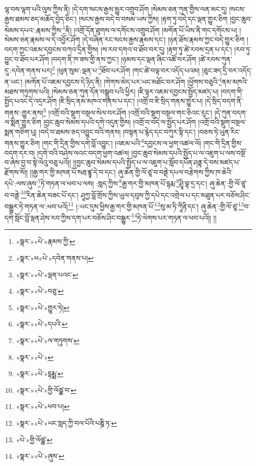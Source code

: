 ལྷ་བས་ལྷག་པའི་ལུས་ཀྱིས་ནི། །དེ་དག་སངས་རྒྱས་མྱུར་འགྲུབ་ཤོག །སེམས་ཅན་ཀུན་གྱིས་ལན་མང་དུ། །སངས་རྒྱས་ཐམས་ཅད་མཆོད་བྱེད་ཅིང་། །སངས་རྒྱས་བདེ་བ་བསམ་ཡས་ཀྱིས། །རྟག་ཏུ་བདེ་དང་ལྡན་གྱུར་ཅིག །བྱང་ཆུབ་སེམས་དཔའ་:རྣམས་ཀྱིས་\footnote{«སྣར་»«པེ་»རྣམས་ཀྱི་}ནི། །འགྲོ་དོན་ཐུགས་ལ་དགོངས་འགྲུབ་ཤོག །མགོན་པོ་ཡིས་ནི་གང་དགོངས་པ། །སེམས་ཅན་རྣམས་ལ་དེ་འབྱོར་ཤོག །དེ་བཞིན་རང་སངས་རྒྱས་རྣམས་དང་། །ཉན་ཐོས་རྣམས་ཀྱང་བདེ་གྱུར་ཅིག །བདག་ཀྱང་འཇམ་དབྱངས་བཀའ་དྲིན་གྱིས། །ས་རབ་དགའ་བ་ཐོབ་བར་དུ། །རྟག་ཏུ་ཚེ་རབས་དྲན་པ་དང་། །རབ་ཏུ་བྱུང་བ་ཐོབ་པར་ཤོག །བདག་ནི་ཁ་ཟས་གྱི་ནས་ཀྱང་། །ཉམས་དང་ལྡན་ཞིང་འཚོ་བར་ཤོག །ཚེ་རབས་ཀུན་དུ་:དབེན་གནས་པར།\footnote{«སྣར་»ཕ«པེ་»དབེན་གནས་པ།} །ཕུན་སུམ་:ལྡན་པ་\footnote{«སྣར་»«པེ་»ལྡན་པའང་}ཐོབ་པར་ཤོག །གང་ཚེ་བལྟ་བར་འདོད་པའམ། །ཅུང་ཟད་དྲི་བར་འདོད་ན་ཡང་། །མགོན་པོ་འཇམ་དབྱངས་དེ་ཉིད་ནི། །གེགས་མེད་པར་ཡང་མཐོང་བར་ཤོག །ཕྱོགས་བཅུའི་\footnote{«སྣར་»«པེ་»བཅུ་}ནམ་མཁའི་མཐས་གཏུགས་པའི། །སེམས་ཅན་ཀུན་དོན་བསྒྲུབ་པའི་ཕྱིར། །ཇི་ལྟར་འཇམ་དབྱངས་སྤྱོད་མཛད་པ། །བདག་གི་སྤྱོད་པའང་དེ་འདྲར་ཤོག །ཇི་སྲིད་ནམ་མཁའ་གནས་པ་དང་། །འགྲོ་བ་ཇི་སྲིད་གནས་གྱུར་པ། །དེ་སྲིད་བདག་ནི་གནས་:གྱུར་ནས།\footnote{«སྣར་»«པེ་»གྱུར་ཏེ།} །འགྲོ་བའི་སྡུག་བསྔལ་སེལ་བར་ཤོག །འགྲོ་བའི་སྡུག་བསྔལ་གང་ཅིའང་རུང་། །དེ་ཀུན་བདག་ལ་སྨིན་གྱུར་ཅིག །བྱང་ཆུབ་སེམས་དཔའི་དགེ་འདུན་གྱིས། །འགྲོ་བ་བདེ་ལ་སྤྱོད་པར་ཤོག །འགྲོ་བའི་སྡུག་བསྔལ་སྨན་གཅིག་པུ། །བདེ་བ་ཐམས་ཅད་འབྱུང་བའི་གནས། །བསྟན་པ་རྙེད་དང་བཀུར་སྟི་དང་། །བཅས་ཏེ་ཡུན་རིང་གནས་གྱུར་ཅིག །གང་གི་དྲིན་གྱིས་དགེ་བློ་འབྱུང་། །འཇམ་པའི་\footnote{«སྣར་»«པེ་»དཔའི་}དབྱངས་ལ་ཕྱག་འཚལ་ལོ། །གང་གི་དྲིན་གྱིས་བདག་དར་བ། །དགེ་བའི་བཤེས་ལའང་བདག་ཕྱག་འཚལ། །བྱང་ཆུབ་སེམས་དཔའི་སྤྱོད་པ་ལ་འཇུག་པ་ལས་བསྔོ་བ་ཞེས་བྱ་བ་སྟེ་ལེའུ་བཅུ་པའོ།། །།བྱང་ཆུབ་སེམས་དཔའི་སྤྱོད་པ་ལ་འཇུག་པ་སློབ་དཔོན་ཤནྟ་དེ་བས་མཛད་པ་རྫོགས་སོ།། །།རྒྱ་གར་གྱི་མཁན་པོ་སརྦ་ཛྙཱ་དེ་བ་དང་། ཞུ་ཆེན་གྱི་ལོ་ཙཱ་བ་བནྡེ་དཔལ་བརྩེགས་ཀྱིས་ཁ་ཆེའི་དཔེ་:ལས་ཞུས་\footnote{«སྣར་»«པེ་»ལ་གཏུགས་}ཏེ་གཏན་ལ་ཕབ་པ་ལས། :སླད་ཀྱིས་\footnote{«སྣར་»«པེ་»}རྒྱ་གར་གྱི་མཁན་པོ་དྷརྨ་\footnote{«སྣར་»«པེ་»དྷརྨྨ་}ཤྲཱི་བྷ་དྲ་དང་། ཞུ་ཆེན་:གྱི་ལོ་ཙཱ་བ་བནྡེ་\footnote{«སྣར་»«པེ་»གྱི་ལོཙྪ་བ་}རིན་ཆེན་བཟང་པོ་དང་། ཤཱཀྱ་བློ་གྲོས་ཀྱིས་ཡུལ་དབུས་ཀྱི་དཔེ་དང་འགྲེལ་པ་དང་མཐུན་པར་བཅོས་ཤིང་བསྒྱུར་ཏེ་གཏན་ལ་:ཕབ་པའོ།\footnote{«སྣར་»«པེ་»ཕབ་པ།} །:ཡང་དུས་ཕྱིས་རྒྱ་གར་གྱི་མཁན་པོ་\footnote{«སྣར་»«པེ་»ཡང་སླད་ཀྱི་བལ་པོའི་པཎྜི་ཏ་}སུ་མ་ཏི་ཀཱིརྟི་དང་། ཞུ་ཆེན་:གྱི་ལོ་ཙཱ་\footnote{«པེ་»གྱི་ལོཙྪ་}བ་དགེ་སློང་བློ་ལྡན་ཤེས་རབ་ཀྱིས་དག་པར་བཅོས་ཤིང་བསྒྱུར་\footnote{«སྣར་»«པེ་»ཞུས་}ཏེ་ལེགས་པར་གཏན་ལ་ཕབ་པའོ།། །།